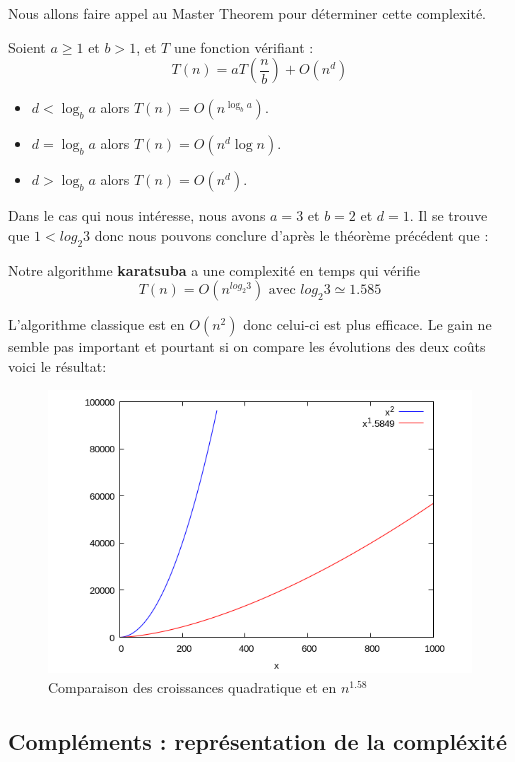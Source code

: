\documentclass[11pt,french]{article}
\theoremstyle{plain}
\begin{document}
Nous allons faire appel au Master Theorem pour déterminer cette complexité.
\begin{theoreme}
    Soient $a\geqslant 1$ et $b>1$, et $T$ une fonction vérifiant :
    \[ T(n)=aT\left( \dfrac{n}{b}\right) + O(n^d) \]
    \begin{itemize}
         \item $ d<\log _{b}a $ alors  $ T(n)=O(n^{\log_b a })$.
        \item $ d= \log _{b}a $ alors  $ T(n)=O(n^d{\log n})$.
          \item $ d>  \log _{b}a $ alors  $ T(n)=O(n^d)$.

    \end{itemize}
    
\end{theoreme}

Dans le cas qui nous intéresse, nous avons $a=3$ et $b=2$ et $d=1$.  Il se trouve que $ 1<log_2 3 $ donc nous pouvons conclure d'après le théorème précédent que : 
\begin{propriete}
    Notre algorithme \textbf{karatsuba} a une complexité en temps qui vérifie \[  T(n)=O(n^{log_2 3})\text{ avec }log_2 3\simeq 1.585 \]
\end{propriete}

 L'algorithme classique est en $O(n^2)$ donc celui-ci est plus efficace. Le gain ne semble pas important et pourtant si on compare les évolutions des deux coûts voici le résultat:
 
\begin{figure}[!h]
    \centering
    \includegraphics[width=0.6\linewidth]{comparaison2}
    \caption{Comparaison des croissances quadratique et en $n^{1.58}$}
    \label{fig:comparaison}
\end{figure}

\subsection{Compléments : représentation de la compléxité}
\end{document}
